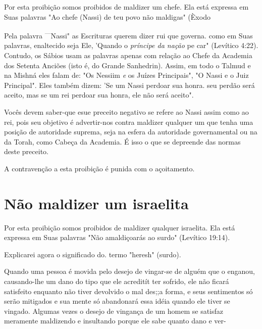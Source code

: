 \begin{itemize}
\begin{enumrate}
\begin{itemize}
\begin{itemize}
\begin{itemize}
Por esta proibição somos proibidos de maldizer um chefe. Ela está
expressa em Suas palavras "Ao chefe (Nassi) de teu povo não maldigas"
(Èxodo

Pela palavra \textsuperscript{---}Nassi" as Escrituras querem dizer rui
que governa. como em Suas palavras, enaltecido seja Ele, 'Quando o
\emph{príncipe da nação} pe car" (Levítico 4:22). Contudo, os Sábios
usam as palavras apenas com relação ao Chefe da Academia dos Setenta
Anciões (isto é, do Grande Sanhedrin). As­sim, em todo o Talmud e na
Mishná eles falam de: "Os Nessiim \emph{e} os Juízes Prin­cipais", "O
Nassi e o Juiz Principal". Eles também dizem: 'Se um Nassi per­doar sua
honra. seu perdão será aceito, mas se um rei perdoar sua honra, ele não
será aceito".

Vocês devem saber-que esue preceito negativo se refere ao Nassi as­sim
como ao rei, pois seu objetivo é advertir-nos contra maldizer qualquer
um que tenha uma posição de autoridade suprema, seja na esfera da
autoridade go­vernamental ou na da Torah, como Cabeça da Academia. É
isso o que se de­preende das normas deste preceito.

A contravenção a esta proibição é punida com o açoitamento.

\section{Não maldizer um israelita}

Por esta proibição somos proibidos de maldizer qualquer israelita. Ela
está expressa em Suas palavras "Não amaldiçoarás ao surdo" (Levítico
19:14).

Explicarei agora o significado do. termo "heresh" (surdo).

Quando uma pessoa é movida pelo desejo de vingar-se de alguém que o
enganou, causando-lhe um dano do tipo que ele acreditít ter sofrido, ele
não ficará satisfeito enquanto não tiver devolvido o mal des;;a forma, e
seus sentimentos só serão mitigados e sua mente só abandonará essa idéia
quando ele tiver se vingado. Algumas vezes o desejo de vingança de um
homem se sa­tisfaz meramente maldizendo e insultando porque ele sabe
quanto dano e ver-



\end{itemize}
\end{itemize}
\end{itemize}
\end{enumrate}
\end{itemize}
